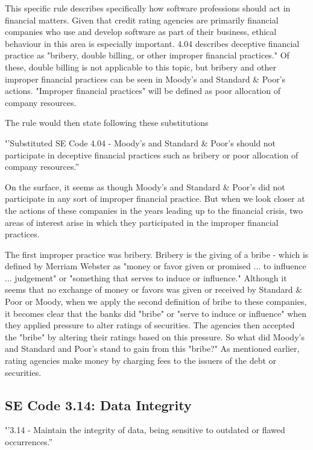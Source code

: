 \documentclass[11pt]{article}
\begin{document}
\begin{multicols}{2}
This specific rule describes specifically how software professions should act in financial matters.  Given that credit rating agencies are primarily financial companies who use and develop software as part of their business, ethical behaviour in this area is especially important.  
4.04 describes deceptive financial practice as "bribery, double billing, or other improper financial practices."  Of these, double billing is not applicable to this topic, but bribery and other improper financial practices can be seen in Moody's and Standard \& Poor's actions.  "Improper financial practices" will be defined as poor allocation of company resources.

The rule would then state following these substitutions


{\addtolength{\leftskip}{6mm}
{\textbf''Substituted SE Code 4.04 - Moody's and Standard \& Poor's should not participate in deceptive financial practices such as bribery or poor allocation of company resources.''}
}


On the surface, it seems as though Moody's and Standard \& Poor's did not participate in any sort of improper financial practice.  But when we look closer at the actions of these companies in the years leading up to the financial crisis, two areas of interest arise in which they participated in the improper financial practices.  

The first improper practice was bribery.  Bribery is the giving of a bribe - which is defined by Merriam Webster as "money or favor given or promised ... to influence ... judgement" or "something that serves to induce or influence." \cite{bribeDef}  Although it seems that no exchange of money or favors was given or received by Standard \& Poor or Moody, when we apply the second definition of bribe to these companies, it becomes clear that the banks did "bribe" or "serve to induce or influence" when they applied pressure to alter ratings of securities.  The agencies then accepted the "bribe" by altering their ratings based on this pressure.  
So what did Moody's and Standard and Poor's stand to gain from this "bribe?"  As mentioned earlier, rating agencies make money by charging fees to the issuers of the debt or securities.  


\subsection{SE Code 3.14: Data Integrity}

{\addtolength{\leftskip}{6mm}
{\textbf''3.14 - Maintain the integrity of data, being sensitive to outdated or flawed occurrences.''}
}


\end{multicols}
\end{document}
